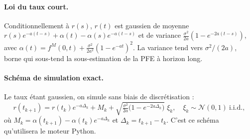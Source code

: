 \documentclass[11pt,a4paper]{article}
\theoremstyle{remark}
\begin{document}
\paragraph{Loi du taux court.} Conditionnellement à $r(s)$, $r(t)$ est gaussien de moyenne $r(s)e^{-a(t-s)} + \alpha(t) - \alpha(s)e^{-a(t-s)}$ et de variance $\frac{\sigma^2}{2a}(1-e^{-2a(t-s)})$, avec $\alpha(t)=f^{M}(0,t)+\frac{\sigma^2}{2a^2}(1-e^{-at})^2$. La variance tend vers $\sigma^2/(2a)$, borne qui sous-tend la sous-estimation de la PFE à horizon long.

\paragraph{Schéma de simulation exact.} Le taux étant gaussien, on simule sans biais de discrétisation :
\begin{equation}
r(t_{k+1}) = r(t_k)e^{-a\Delta_k} + M_k + \sqrt{\tfrac{\sigma^2}{2a}\big(1-e^{-2a\Delta_k}\big)}\;\xi_k, \quad \xi_k \sim \mathcal{N}(0,1)\ \text{i.i.d.},
\end{equation}
où $M_k = \alpha(t_{k+1}) - \alpha(t_k)e^{-a\Delta_k}$ et $\Delta_k = t_{k+1}-t_k$. C'est ce schéma qu'utilisera le moteur Python.
\end{document}
